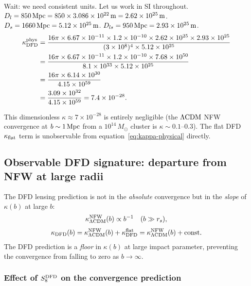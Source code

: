 \documentclass[11pt]{article}
\newcommand{\ee}[1]{\times 10^{#1}}
\newcommand{\DFD}{{\rm DFD}}
\newcommand{\LCDM}{\Lambda{\rm CDM}}
\begin{document}
Wait: we need consistent units. Let us work in SI throughout.
$D_l = 850\,{\rm Mpc} = 850\times 3.086\ee{22}\,{\rm m}
= 2.62\ee{25}\,{\rm m}$.
$D_s = 1660\,{\rm Mpc} = 5.12\ee{25}\,{\rm m}$.
$D_{ls} = 950\,{\rm Mpc} = 2.93\ee{25}\,{\rm m}$.
\begin{align}
  \kappa_{\DFD}^{\rm phys}
  &= \frac{16\pi\times 6.67\ee{-11}\times 1.2\ee{-10}
    \times 2.62\ee{25}\times 2.93\ee{25}}
    {(3\ee{8})^4\times 5.12\ee{25}} \nonumber\\
  &= \frac{16\pi\times 6.67\ee{-11}\times 1.2\ee{-10}
    \times 7.68\ee{50}}{8.1\ee{33}\times 5.12\ee{25}} \nonumber\\
  &= \frac{16\pi\times 6.14\ee{30}}{4.15\ee{59}} \nonumber\\
  &= \frac{3.09\ee{32}}{4.15\ee{59}} = 7.4\ee{-28}.
\end{align}

\noindent This dimensionless $\kappa \approx 7\ee{-28}$ is entirely negligible
(the $\LCDM$ NFW convergence at $b \sim 1\,{\rm Mpc}$ from a $10^{14}\,M_\odot$
cluster is $\kappa \sim 0.1$--$0.3$).  The flat DFD $\kappa_{\rm flat}$
term is unobservable from equation~\eqref{eq:kappa-physical} directly.

\subsection{Observable DFD signature: departure from NFW at large radii}

The DFD lensing prediction is not in the \emph{absolute} convergence
but in the \emph{slope} of $\kappa(b)$ at large $b$:
\begin{equation}\label{eq:kappa-nfw}
  \kappa_{\LCDM}^{\rm NFW}(b) \propto b^{-1}\quad(b \gg r_s),
\end{equation}
\begin{equation}\label{eq:kappa-dfd-slope}
  \kappa_{\DFD}(b) = \kappa_{\LCDM}^{\rm NFW}(b) + \kappa_{\DFD}^{\rm flat}
  = \kappa_{\LCDM}^{\rm NFW}(b) + {\rm const}.
\end{equation}
The DFD prediction is a \emph{floor} in $\kappa(b)$ at large impact
parameter, preventing the convergence from falling to zero as $b \to \infty$.

\subsubsection{Effect of $S_8^{\DFD}$ on the convergence prediction}
\end{document}
